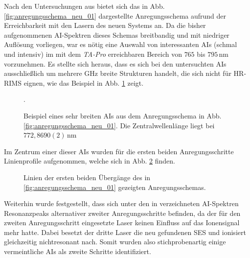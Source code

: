 Nach den Untersuchungen aus \cite{raeder:2011:dissertation} bietet sich das in
Abb. \ref{fig:anregungsschema_neu_01} dargestellte Anregungsschema aufrund der
Erreichbarkeit mit den Lasern des neuen Systems an. Da die bisher
aufgenommenen AI-Spektren dieses Schemas breitbandig und mit niedriger Auflösung vorliegen, war es nötig eine Auswahl von
interessanten AIs (schmal und intensiv) im mit dem \textit{TA-Pro} erreichbaren
Bereich von $765$ bis $795\,$nm vorzunehmen. Es stellte
sich heraus, dass es sich bei den untersuchten AIs ausschließlich um mehrere GHz
breite Strukturen handelt, die sich nicht für HR-RIMS eignen, wie das Beispiel
in Abb. \ref{fig:linienscans_neues_schema_01_AI_bsp} zeigt.
\begin{figure}[h]
 	\centering
 	\footnotesize
	
	\caption[AI Beispiel, neues Schema (1)]{Beispiel eines sehr breiten AIs aus dem
	Anregungsschema in Abb. \ref{fig:anregungsschema_neu_01}. Die
	Zentralwellenlänge liegt bei $772,8690(2)\,$nm}.
	\label{fig:linienscans_neues_schema_01_AI_bsp}
\end{figure}
Im Zentrum einer dieser AIs wurden für die ersten beiden Anregungsschritte
Linienprofile aufgenommen, welche sich in Abb. \ref{fig:linienscans_neues_schema_01} finden.
\begin{figure}[hp]
 	\centering
 	\footnotesize
	\caption[erster und zweiter Anregungsschritt, neues System, Schema (1)]{Linien
	der ersten beiden Übergänge des in \ref{fig:anregungsschema_neu_01} gezeigten
	Anregungsschemas.}
	\label{fig:linienscans_neues_schema_01}
\end{figure}
Weiterhin wurde festgestellt, dass sich unter den in
\cite{raeder:2011:dissertation} verzeichneten AI-Spektren Resonanzpeaks
alternativer zweiter Anregungsschritte befinden, da der für den
zweiten Anregungsschritt eingesetzte Laser keinen Einfluss auf das Ionensignal
mehr hatte.
Dabei besetzt der dritte Laser die neu gefundenen SES und
ionisiert gleichzeitig nichtresonant nach. Somit wurden also stichprobenartig
einige vermeintliche AIs als zweite Schritte identifiziert.\par
